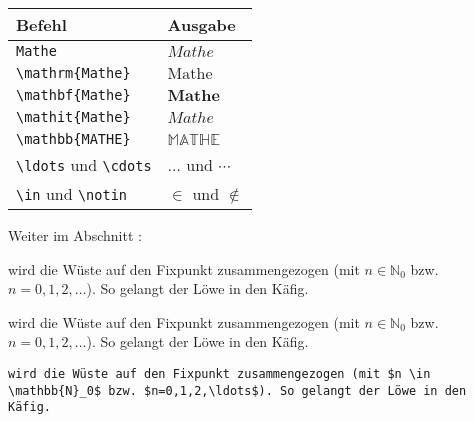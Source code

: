 \begin{frame}[fragile]
	\begin{center}
		\begin{tabular}{ll}
			\toprule
			Befehl							&	Ausgabe					\\ \midrule
			\lstinline|Mathe|				&	$Mathe$					\\
			\lstinline|\mathrm{Mathe}|		&	$\mathrm{Mathe}$		\\
			\lstinline|\mathbf{Mathe}|		&	$\mathbf{Mathe}$		\\
			\lstinline|\mathit{Mathe}|		&	$\mathit{Mathe}$		\\
			\lstinline|\mathbb{MATHE}|					&	$\mathbb{MATHE}$		\\
			\lstinline|\ldots| und \lstinline|\cdots|	&	$\ldots$ und $\cdots$	\\
			\lstinline|\in| und \lstinline|\notin|		&	$\in$ und $\notin$		\\
			\bottomrule
		\end{tabular}
	\end{center}
	\pause\btVFill
	\Aufgabee
	Weiter im Abschnitt :
	\begin{outputbox}
		wird die Wüste auf den Fixpunkt zusammengezogen (mit $n \in \mathbb{N}_0$ bzw. $n=0,1,2,\ldots$). So gelangt der Löwe in den Käfig.
	\end{outputbox}
	\vspace{1.3cm}
\end{frame}
\begin{frame}[fragile]
	\Losung
	\begin{outputbox}
		wird die Wüste auf den Fixpunkt zusammengezogen (mit $n \in \mathbb{N}_0$ bzw. $n=0,1,2,\ldots$). So gelangt der Löwe in den Käfig.
	\end{outputbox}

	\Code
	\begin{lstlisting}[gobble=4]
    wird die Wüste auf den Fixpunkt zusammengezogen (mit $n \in \mathbb{N}_0$ bzw. $n=0,1,2,\ldots$). So gelangt der Löwe in den Käfig.
	\end{lstlisting}
\end{frame}
